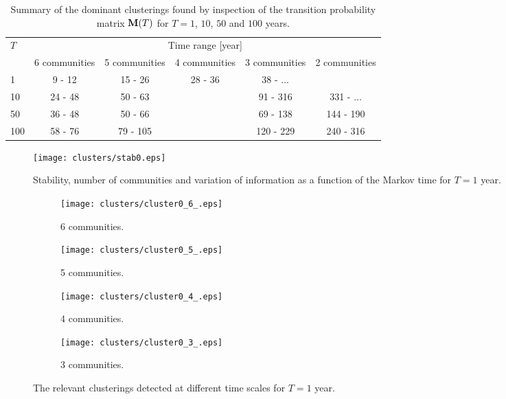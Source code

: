 \begin{table}[H]
\centering
\caption{Summary of the dominant clusterings found by inspection of the transition probability matrix $\mathbf M(T)$ for $T = 1$, $10$, $50$ and $100$ years.}
\label{tab:partitions_summary}
\begin{tabular}{l|ccccc}
\hline
\multirow{2}{*}{$T$} & \multicolumn{5}{c}{Time range [year]} \\ \cline{2-6} 
                  &  6 communities &  5 communities  &  4 communities  &  3 communities &  2 communities \\ \hline
              1   & \phantom{0}9 - 12  & 15 - 26 & 28 - 36 & \phantom{0}38 - $\dots$  &   \\
              10  & 24 - 48 &  50 - 63 & & \phantom{0}91 - 316 & 331 - $\dots$ \\
              50  & 36 - 48 & 50 - 66 & & \phantom{0}69 - 138 & 144 - 190 \\
              100 & 58 - 76 & 79 - 105 & &120 - 229 & 240 - 316 \\ \hline
\end{tabular}
\end{table}

\begin{figure}[H]
	\centering
	\texttt{[image: clusters/stab0.eps]}
	\caption{Stability, number of communities and variation of information as a function of the Markov time for $T=1$ year.}
	\label{fig:stab0}
\end{figure}

\begin{figure}[H]
	\centering
	\begin{subfigure}[t]{0.49\textwidth}
		\texttt{[image: clusters/cluster0\_6\_.eps]}
		\caption{6 communities.}
		\label{fig:cluster0_6_}
	\end{subfigure}
	\begin{subfigure}[t]{0.49\textwidth}
		\texttt{[image: clusters/cluster0\_5\_.eps]}
		\caption{5 communities.}
		\label{fig:cluster0_5_}
	\end{subfigure}
	\begin{subfigure}[t]{0.49\textwidth}
		\texttt{[image: clusters/cluster0\_4\_.eps]}
		\caption{4 communities.}
		\label{fig:cluster0_4_}
	\end{subfigure}
	\begin{subfigure}[t]{0.49\textwidth}
		\texttt{[image: clusters/cluster0\_3\_.eps]}
		\caption{3 communities.}
		\label{fig:cluster0_3_}
	\end{subfigure}
	\caption{The relevant clusterings detected at different time scales for $T=1$ year.}
	\label{fig:cluster0}
\end{figure}

